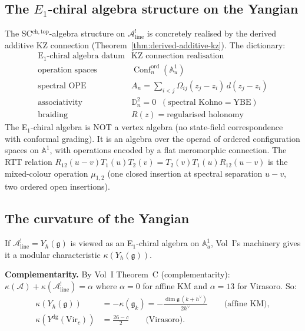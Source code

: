 \documentclass[11pt]{article}
\newcommand{\cA}{\mathcal{A}}
\newcommand{\fg}{\mathfrak{g}}
\DeclareMathOperator{\Conf}{Conf}
\begin{document}
\subsection{The $E_1$-chiral algebra structure on the Yangian}

The SC${}^{\mathrm{ch,top}}$-algebra structure on
$\cA^!_{\mathrm{line}}$ is concretely realised by the
derived additive KZ connection
(Theorem~\ref{thm:derived-additive-kz}).  The dictionary:
\[
\begin{array}{c|c}
\text{E}_1\text{-chiral algebra datum} &
  \text{KZ connection realisation} \\
\hline
\text{operation spaces} &
  \Conf_n^{\mathrm{ord}}(\mathbb{A}^1_u) \\
\text{spectral OPE} &
  A_n = \sum_{i<j}\Omega_{ij}(z_j - z_i)\,d(z_j - z_i) \\
\text{associativity} &
  \mathbb{D}_n^2 = 0
  \;\;(\text{spectral Kohno} = \text{YBE}) \\
\text{braiding} &
  R(z) = \text{regularised holonomy}
\end{array}
\]
The E$_1$-chiral algebra is NOT a vertex algebra (no
state-field correspondence with conformal grading).  It is an
algebra over the operad of ordered configuration spaces on
$\mathbb{A}^1$, with operations encoded by a flat meromorphic
connection.  The RTT relation $R_{12}(u-v)T_1(u)T_2(v) =
T_2(v)T_1(u)R_{12}(u-v)$ is the mixed-colour operation
$\mu_{1,2}$ (one closed insertion at spectral separation $u-v$,
two ordered open insertions).


\subsection{The curvature of the Yangian}

If $\cA^!_{\mathrm{line}} = Y_\hbar(\fg)$ is viewed as an
E$_1$-chiral algebra on $\mathbb{A}^1_u$, Vol~I's machinery
gives it a modular characteristic
$\kappa(Y_\hbar(\fg))$.

\medskip\noindent\textbf{Complementarity.}\enspace
By Vol~I Theorem~C (complementarity):
$\kappa(\cA) + \kappa(\cA^!_{\mathrm{line}}) = \alpha$
where $\alpha = 0$ for affine KM and $\alpha = 13$ for
Virasoro.  So:
\begin{align*}
\kappa(Y_\hbar(\fg))
&= -\kappa(\widehat{\fg}_k)
= -\frac{\dim\fg\,(k+h^\vee)}{2h^\vee}
\qquad\text{(affine KM)}, \\
\kappa(Y^{\mathrm{dg}}(\mathrm{Vir}_c))
&= \frac{26-c}{2}
\qquad\text{(Virasoro)}.
\end{align*}
\end{document}
